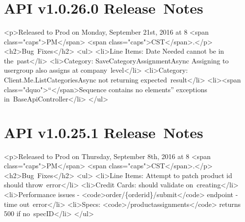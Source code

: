 \documentclass{memoir}%
\begin{document}
%
\section*{API v1.0.26.0 Release~Notes}%
\paragraph*{}%

%
\paragraph*{}%
<p>Released to Prod on Monday, September 21st, 2016 at 8 <span class="caps">PM</span> <span class="caps">CST</span>.</p>\newline%
<h2>Bug~Fixes</h2>\newline%
<ul>\newline%
<li>Line Items: Date Needed cannot be in the~past</li>\newline%
<li>Category: SaveCategoryAssignmentAsync Assigning to usergroup also assigns at company~level</li>\newline%
<li>Category: Client.Me.ListCategoriesAsync not returning expected~result</li>\newline%
<li><span class="dquo">“</span>Sequence contains no elements” exceptions in~BaseApiController</li>\newline%
</ul>

%
\section*{API v1.0.25.1 Release~Notes}%
\paragraph*{}%

%
\paragraph*{}%
<p>Released to Prod on Thursday, September 8th, 2016 at 8 <span class="caps">PM</span> <span class="caps">CST</span>.</p>\newline%
<h2>Bug~Fixes</h2>\newline%
<ul>\newline%
<li>Line Items: Attempt to patch product id should throw~error</li>\newline%
<li>Credit Cards: should validate on~creating</li>\newline%
<li>Performance issues {-} <code>order/\{orderid\}/submit</code> endpoint {-} time out~error</li>\newline%
<li>Specs: <code>/productassignments</code> returns 500 if no~specID</li>\newline%
</ul>
\end{document}
